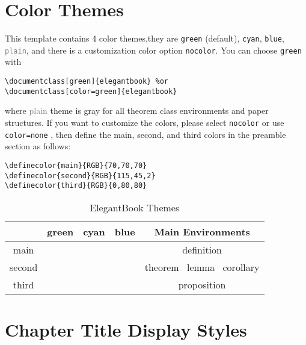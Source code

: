 \documentclass{elegantbook}
\begin{document}
\section{Color Themes}
This template contains 4 color themes,they are \textcolor{main1}{\lstinline{green}} (default), \textcolor{main2}{\lstinline{cyan}}, \textcolor{main3}{\lstinline{blue}}, \textcolor{gray}{\lstinline{plain}}, and there is a customization color option  \lstinline{nocolor}. You can choose \lstinline{green} with  

\begin{lstlisting}[frame=single]
\documentclass[green]{elegantbook} %or
\documentclass[color=green]{elegantbook}
\end{lstlisting}

where \textcolor{gray}{plain} theme is gray for all theorem class environments and paper structures. If you want to customize the colors, please select \lstinline{nocolor} or use \lstinline{color=none} , then define the main, second, and third colors in the preamble section as follows:
\begin{lstlisting}[frame=single]
\definecolor{main}{RGB}{70,70,70}    
\definecolor{second}{RGB}{115,45,2}    
\definecolor{third}{RGB}{0,80,80}   
\end{lstlisting}

\begin{table}[htp]
\caption{ElegantBook Themes\label{tab:color thm}}
\centering
\begin{tabular}{ccccc}
\toprule
	  & \textcolor{main1}{green} & \textcolor{main2}{cyan} & \textcolor{main3}{blue} & Main Environments\\
\midrule
main & \makecell{{\color{main1}\rule{1cm}{1cm}}}& \makecell{{\color{main2}\rule{1cm}{1cm}}}&\makecell{ {\color{main3}\rule{1cm}{1cm}}}& definition \\

second &\makecell{ {\color{second1}\rule{1cm}{1cm}}}& \makecell{{\color{second2}\rule{1cm}{1cm}}}&\makecell{ {\color{second3}\rule{1cm}{1cm}}}&theorem \ lemma \ corollary\\

third &\makecell{ {\color{third1}\rule{1cm}{1cm}}}& \makecell{{\color{third2}\rule{1cm}{1cm}}}&\makecell{ {\color{third3}\rule{1cm}{1cm}}}&proposition\\
\bottomrule
\end{tabular}
\end{table}

\section{Chapter Title Display Styles}
\end{document}
